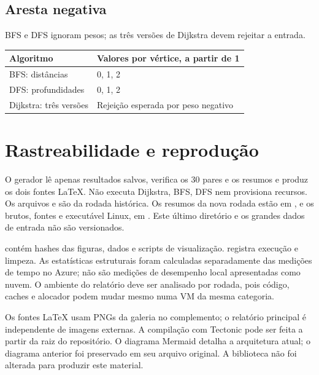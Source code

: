 \documentclass[a4paper,12pt]{article}
\newcommand{\cod}[1]{\texttt{\detokenize{#1}}}
\begin{document}
\par\noindent\begin{minipage}{\textwidth}\subsection{Aresta negativa}
BFS e DFS ignoram pesos; as três versões de Dijkstra devem rejeitar a entrada.
\par\smallskip\noindent\begin{minipage}{\textwidth}\centering
\begingroup\small
\setlength{\tabcolsep}{4pt}
\begin{tabular}{l>{\raggedright\arraybackslash}p{10.4cm}}
\toprule
Algoritmo & Valores por vértice, a partir de 1 \\
\midrule
BFS: distâncias & \num{0}, \num{1}, \num{2} \\
DFS: profundidades & \num{0}, \num{1}, \num{2} \\
Dijkstra: três versões & Rejeição esperada por peso negativo \\
\bottomrule
\end{tabular}
\endgroup
\end{minipage}\par\smallskip
\end{minipage}\par\medskip
\section{Rastreabilidade e reprodução}
O gerador  lê apenas resultados salvos, verifica os 30 pares e os resumos e produz os dois fontes LaTeX. Não executa Dijkstra, BFS, DFS nem provisiona recursos. Os arquivos  e \cod{paths_weighted.csv} são da rodada histórica. Os resumos da nova rodada estão em , e os brutos, fontes e executável Linux, em . Este último diretório e os grandes dados de entrada não são versionados.

 contém hashes das figuras, dados e scripts de visualização.  registra execução e limpeza. As estatísticas estruturais foram calculadas separadamente das medições de tempo no Azure; não são medições de desempenho local apresentadas como nuvem. O ambiente do relatório deve ser analisado por rodada, pois código, caches e alocador podem mudar mesmo numa VM da mesma categoria.

Os fontes LaTeX usam PNGs da galeria no complemento; o relatório principal é independente de imagens externas. A compilação com Tectonic pode ser feita a partir da raiz do repositório. O diagrama Mermaid detalha a arquitetura atual; o diagrama anterior foi preservado em seu arquivo original. A biblioteca não foi alterada para produzir este material.
\end{document}
